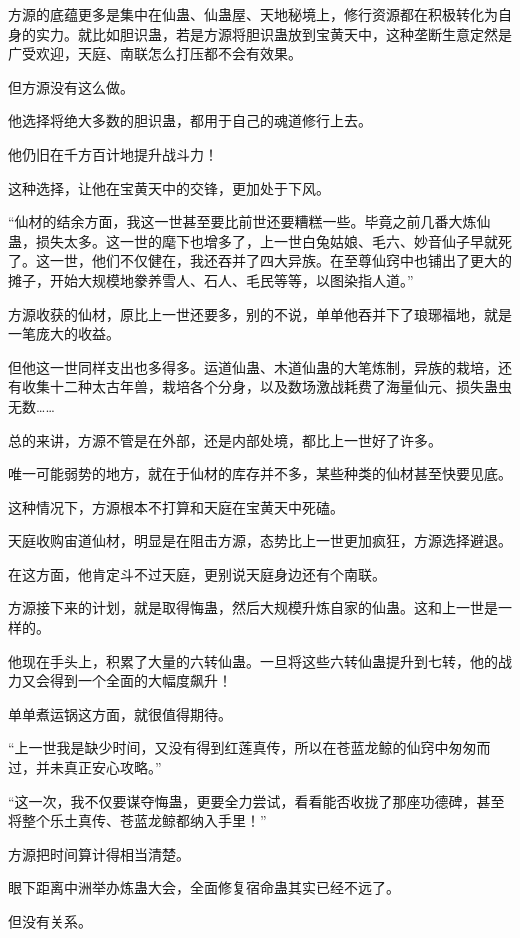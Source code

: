 \begin{this_body}
方源的底蕴更多是集中在仙蛊、仙蛊屋、天地秘境上，修行资源都在积极转化为自身的实力。就比如胆识蛊，若是方源将胆识蛊放到宝黄天中，这种垄断生意定然是广受欢迎，天庭、南联怎么打压都不会有效果。

但方源没有这么做。

他选择将绝大多数的胆识蛊，都用于自己的魂道修行上去。

他仍旧在千方百计地提升战斗力！

这种选择，让他在宝黄天中的交锋，更加处于下风。

“仙材的结余方面，我这一世甚至要比前世还要糟糕一些。毕竟之前几番大炼仙蛊，损失太多。这一世的麾下也增多了，上一世白兔姑娘、毛六、妙音仙子早就死了。这一世，他们不仅健在，我还吞并了四大异族。在至尊仙窍中也铺出了更大的摊子，开始大规模地豢养雪人、石人、毛民等等，以图染指人道。”

方源收获的仙材，原比上一世还要多，别的不说，单单他吞并下了琅琊福地，就是一笔庞大的收益。

但他这一世同样支出也多得多。运道仙蛊、木道仙蛊的大笔炼制，异族的栽培，还有收集十二种太古年兽，栽培各个分身，以及数场激战耗费了海量仙元、损失蛊虫无数……

总的来讲，方源不管是在外部，还是内部处境，都比上一世好了许多。

唯一可能弱势的地方，就在于仙材的库存并不多，某些种类的仙材甚至快要见底。

这种情况下，方源根本不打算和天庭在宝黄天中死磕。

天庭收购宙道仙材，明显是在阻击方源，态势比上一世更加疯狂，方源选择避退。

在这方面，他肯定斗不过天庭，更别说天庭身边还有个南联。

方源接下来的计划，就是取得悔蛊，然后大规模升炼自家的仙蛊。这和上一世是一样的。

他现在手头上，积累了大量的六转仙蛊。一旦将这些六转仙蛊提升到七转，他的战力又会得到一个全面的大幅度飙升！

单单煮运锅这方面，就很值得期待。

“上一世我是缺少时间，又没有得到红莲真传，所以在苍蓝龙鲸的仙窍中匆匆而过，并未真正安心攻略。”

“这一次，我不仅要谋夺悔蛊，更要全力尝试，看看能否收拢了那座功德碑，甚至将整个乐土真传、苍蓝龙鲸都纳入手里！”

方源把时间算计得相当清楚。

眼下距离中洲举办炼蛊大会，全面修复宿命蛊其实已经不远了。

但没有关系。


\end{this_body}
